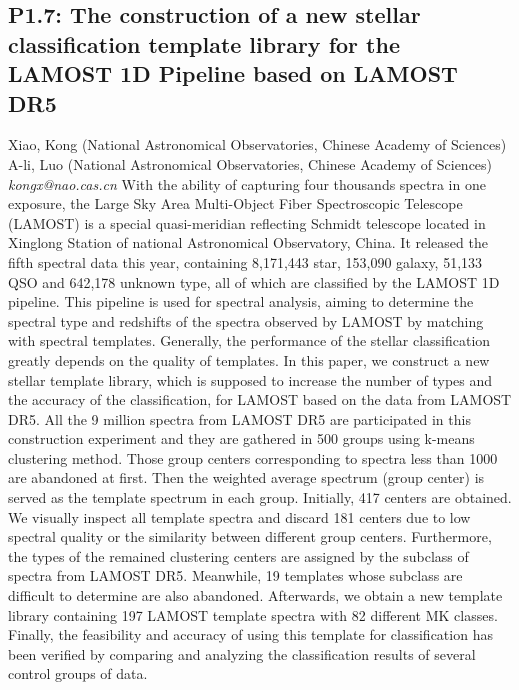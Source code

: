 \documentclass{report}
\begin{document}
\subsection*{P1.7: The construction of a new stellar classification template library for the LAMOST 1D Pipeline based on LAMOST DR5}
\bigskip
Xiao, Kong (National Astronomical Observatories, Chinese Academy of Sciences) \newline A-li, Luo (National Astronomical Observatories, Chinese Academy of Sciences) \newline   \newline   \newline  \newline  \newline\newline
{\it kongx@nao.cas.cn}\newline
\newline\newline
With the ability of capturing four thousands spectra in one exposure, the Large Sky Area Multi-Object Fiber Spectroscopic Telescope (LAMOST) is a special quasi-meridian reflecting Schmidt telescope located in Xinglong Station of national Astronomical Observatory, China.
It released the fifth spectral data this year, containing 8,171,443 star, 153,090 galaxy, 51,133 QSO and 642,178 unknown type, all of which are classified by the LAMOST 1D pipeline.
This pipeline is used for spectral analysis, aiming to determine the spectral type and redshifts of the spectra observed by LAMOST by matching with spectral templates.
Generally, the performance of the stellar classification greatly depends on the quality of templates.
In this paper, we construct a new stellar template library, which is supposed to increase the number of types and the accuracy of the classification, for LAMOST based on the data from LAMOST DR5.
All the 9 million spectra from LAMOST DR5 are participated in this construction experiment and they are gathered in 500 groups using k-means clustering method.
Those group centers corresponding to spectra less than 1000 are abandoned at first.
Then the weighted average spectrum (group center) is served as the template spectrum in each group.
Initially, 417 centers are obtained.
We visually inspect all template spectra and discard 181 centers due to low spectral quality or the similarity between different group centers.
Furthermore, the types of the remained clustering centers are assigned by the subclass of spectra from LAMOST DR5.
Meanwhile, 19 templates whose subclass are difficult to determine are also abandoned.
Afterwards, we obtain a new template library containing 197 LAMOST template spectra with 82 different MK classes.
Finally, the feasibility and accuracy of using this template for classification has been verified by comparing and analyzing the classification results of several control groups of data.\newline
\newpage
\end{document}

